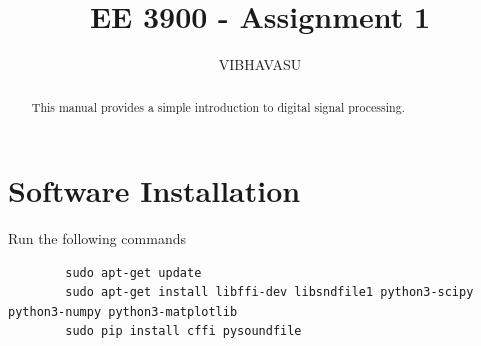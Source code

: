 \documentclass[journal,12pt,twocolumn]{IEEEtran}
\renewcommand\thesection{\arabic{section}}
\begin{document}
	\let\StandardTheFigure\thefigure
	\renewcommand{\thefigure}{\theproblem}
	
	
	
	\def\putbox#1#2#3{\makebox[0in][l]{\makebox[#1][l]{}\raisebox{\baselineskip}[0in][0in]{\raisebox{#2}[0in][0in]{#3}}}}
	\def\rightbox#1{\makebox[0in][r]{#1}}
	\def\centbox#1{\makebox[0in]{#1}}
	\def\topbox#1{\raisebox{-\baselineskip}[0in][0in]{#1}}
	\def\midbox#1{\raisebox{-0.5\baselineskip}[0in][0in]{#1}}
	
	\vspace{3cm}
	
	\title{ EE 3900 - Assignment 1}
	
	\author{VIBHAVASU}
	
	\maketitle
	
	
	\tableofcontents
	
	
	\renewcommand{\thefigure}{\theenumi}
	\renewcommand{\thetable}{\theenumi}
	
	
	
	\bigskip
	
	\begin{abstract}
		This manual provides a simple introduction to digital signal processing.
	\end{abstract}
	\section{Software Installation}
	Run the following commands
	\begin{lstlisting}
		sudo apt-get update
		sudo apt-get install libffi-dev libsndfile1 python3-scipy  python3-numpy python3-matplotlib 
		sudo pip install cffi pysoundfile 
	\end{lstlisting}
\end{document}
